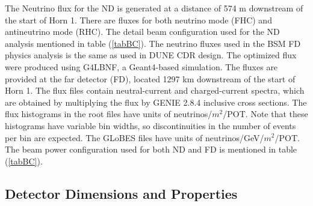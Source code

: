 The Neutrino flux for the ND is generated at a distance of 574 m downstream of the start of Horn 1. There are fluxes for both neutrino mode (FHC) and antineutrino mode (RHC). The detail beam configuration used for the ND analysis mentioned in table (\ref{tabBC}).
The neutrino fluxes used in the BSM FD physics analysis is the same as used in DUNE CDR\cite{DUNECDR:FDflux} design. The optimized flux were produced using G4LBNF, a Geant4-based simulation.  The  fluxes are provided at the far detector (FD), located 1297 km downstream of the start of Horn 1. The flux files  contain neutral-current and charged-current spectra, which are obtained by multiplying the flux by GENIE 2.8.4 inclusive cross sections.  The flux histograms in the root files have
units of neutrinos/$m^{2}$/POT. Note that these histograms have variable bin widths, so discontinuities in the number of events per bin are expected. The GLoBES files have units of neutrinos/GeV/$m^{2}$/POT.\\
The beam power configuration used for both ND and FD is mentioned in table (\ref{tabBC}).
\begin{table}[h]
    \begin{center}
        \end{center}
        \caption{\label{tabBC} Beam Power Configurations used for ND and FD }
    \end{table} 
\subsection{Detector Dimensions and Properties}

